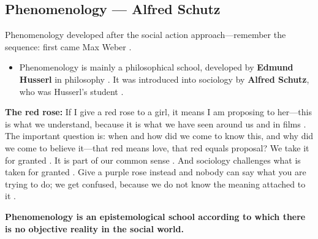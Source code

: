 \subsection{Phenomenology --- Alfred Schutz}
Phenomenology developed after the social action approach---remember the sequence: first came Max Weber .
\begin{itemize}
    \item Phenomenology is mainly a philosophical school, developed by \textbf{Edmund Husserl} in philosophy . It was introduced into sociology by \textbf{Alfred Schutz}, who was Husserl's student .
\end{itemize}

\begin{ExampleBox}
\textbf{The red rose:} If I give a red rose to a girl, it means I am proposing to her---this is what we understand, because it is what we have seen around us and in films . The important question is: when and how did we come to know this, and why did we come to believe it---that red means love, that red equals proposal?  We take it for granted . It is part of our common sense . And sociology challenges what is taken for granted . Give a purple rose instead and nobody can say what you are trying to do; we get confused, because we do not know the meaning attached to it .
\end{ExampleBox}

\begin{KeyConcept}
\textbf{Phenomenology is an epistemological school according to which there is no objective reality in the social world.} 
\end{KeyConcept}

